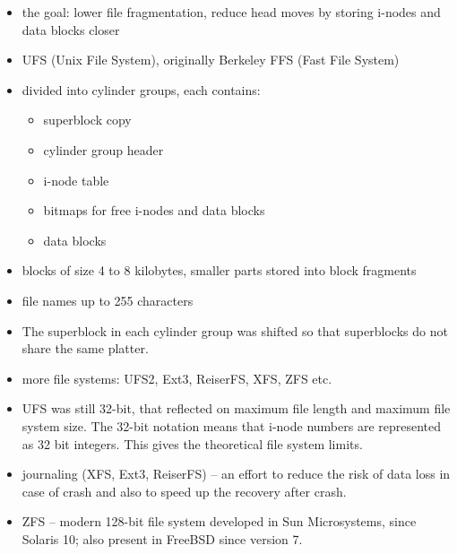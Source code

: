 \begin{slide}
\begin{itemize}
\item the goal: lower file fragmentation, reduce head moves by storing i-nodes
and data blocks closer
\item UFS (Unix File System), originally Berkeley FFS (Fast File System)
\item divided into cylinder groups, each contains:
    \begin{itemize}
    \item superblock copy
    \item cylinder group header
    \item i-node table
    \item bitmaps for free i-nodes and data blocks
    \item data blocks
    \end{itemize}
\item blocks of size 4 to 8 kilobytes, smaller parts stored into block fragments
\item file names up to 255 characters
\end{itemize}
\end{slide}

\begin{itemize}
\item The superblock in each cylinder group was shifted so that superblocks do
not share the same platter.
\item more file systems: UFS2, Ext3, ReiserFS, XFS, ZFS etc.
\item UFS was still 32-bit, that reflected on maximum file length and maximum
file system size. The 32-bit notation means that i-node numbers are represented
as 32 bit integers. This gives the theoretical file system limits.
\item journaling (XFS, Ext3, ReiserFS) -- an effort to reduce the risk of data
loss in case of crash and also to speed up the recovery after crash.
\item ZFS -- modern 128-bit file system developed in Sun Microsystems, since
Solaris 10; also present in FreeBSD since version 7.
\end{itemize}


